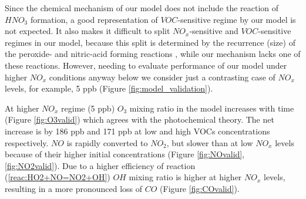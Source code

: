 \documentclass[11pt,a4paper]{article}
\begin{document}
Since the chemical mechanism of our model does not include the reaction of $HNO_3$ formation, a good representation of $VOC$-sensitive regime by our model is not expected. It also makes it difficult to split $NO_x$-sensitive and $VOC$-sensitive regimes in our model, because this split is determined by the recurrence (size) of the peroxide- and nitric-acid forming reactions \citep{Sillman1999}, while our mechanism lacks one of these reactions. However, needing to evaluate performance of our model under higher $NO_x$ conditions anyway below we consider just a contrasting case of $NO_x$ levels, for example, 5 ppb (Figure \ref{fig:model_validation}).

At higher $NO_x$ regime (5 ppb) $O_3$ mixing ratio in the model increases with time (Figure \ref{fig:O3valid}) which agrees with the photochemical theory. The net increase is by 186 ppb and 171 ppb at low and high VOCs concentrations respectively. $NO$ is rapidly converted to $NO_2$, but slower than at low $NO_x$ levels because of their higher initial concentrations (Figure \ref{fig:NOvalid}, \ref{fig:NO2valid}). Due to a higher efficiency of reaction (\ref{reac:HO2+NO=NO2+OH}) $OH$ mixing ratio is higher at higher $NO_x$ levels, resulting in a more pronounced loss of $CO$ (Figure \ref{fig:COvalid}).
\end{document}
